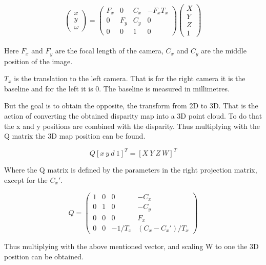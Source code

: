 \begin{equation}\label{eq:projection}
 \begin{split}
  \begin{pmatrix}
   x \\
   y \\
   \omega 
  \end{pmatrix}	
  = 
  \begin{pmatrix}
    F_{x} & 0 & C_{x} & -F_{x}T_{x} \\
    0 & F_{y} & C_{y} & 0 \\
    0 & 0 & 1 & 0
  \end{pmatrix}
  \begin{pmatrix}
   X \\
   Y \\
   Z \\
   1 
  \end{pmatrix}	
 \end{split}
\end{equation}  


Here $F_{x}$ and $F_{y}$ are the focal length of the camera, $C_{x}$ and $C_{y}$ are the middle position of the image.

$T_{x}$ is the translation to the left camera. That is for the right camera it is the baseline and for the left it is 0. The baseline is measured in millimetres. 

But the goal is to obtain the opposite, the transform from 2D to 3D. That is the action of converting the obtained disparity map into a 3D point cloud. To do that the x and y positions are combined with the disparity. Thus multiplying with the Q matrix the 3D map position can be found.

\[ Q [ x \ y \ d \ 1 ]^{T} = [ X \ Y \ Z \ W ]^{T} \]

Where the Q matrix is defined by the parameters in the right projection matrix, except for the $C_{x}'$.

\[
Q =
 \begin{pmatrix}
  1 & 0 & 0 & -C_{x} \\
  0 & 1 & 0 & -C_{y} \\
  0 & 0 & 0 & F_{x} \\
  0 & 0 & -1/T_{x} & (C_{x}-C_{x}')/T_{x} 
 \end{pmatrix}
\]

Thus multiplying with the above mentioned vector, and scaling W to one the 3D position can be obtained.

